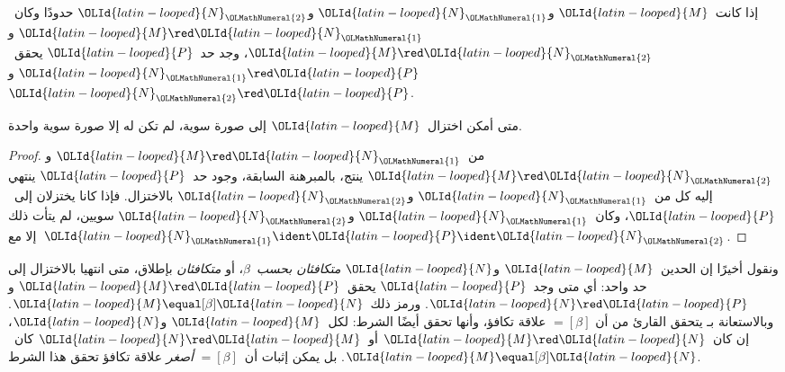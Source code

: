 \documentclass[../../../include/open-logic-section]{subfiles}
\begin{document}

\begin{thm}
إذا كانت~$\OLId{latin-looped}{M}$ و$\OLId{latin-looped}{N}_\OLMathNumeral{1}$ و$\OLId{latin-looped}{N}_\OLMathNumeral{2}$ حدودًا وكان~$\OLId{latin-looped}{M} \red \OLId{latin-looped}{N}_\OLMathNumeral{1}$ و$\OLId{latin-looped}{M} \red \OLId{latin-looped}{N}_\OLMathNumeral{2}$،
وجد حد~$\OLId{latin-looped}{P}$ يحقق~$\OLId{latin-looped}{N}_\OLMathNumeral{1} \red \OLId{latin-looped}{P}$ و$\OLId{latin-looped}{N}_\OLMathNumeral{2} \red \OLId{latin-looped}{P}$.
\end{thm}

\begin{cor}
متى أمكن اختزال~$\OLId{latin-looped}{M}$ إلى صورة سوية، لم تكن له إلا صورة سوية واحدة.
\end{cor}

\begin{proof}
من~$\OLId{latin-looped}{M} \red \OLId{latin-looped}{N}_\OLMathNumeral{1}$ و$\OLId{latin-looped}{M} \red \OLId{latin-looped}{N}_\OLMathNumeral{2}$ ينتج، بالمبرهنة السابقة،
وجود حد~$\OLId{latin-looped}{P}$ ينتهي إليه كل من~$\OLId{latin-looped}{N}_\OLMathNumeral{1}$ و$\OLId{latin-looped}{N}_\OLMathNumeral{2}$ بالاختزال.
فإذا كانا يختزلان إلى~$\OLId{latin-looped}{P}$، وكان~$\OLId{latin-looped}{N}_\OLMathNumeral{1}$ و$\OLId{latin-looped}{N}_\OLMathNumeral{2}$ سويين،
لم يتأت ذلك إلا مع~$\OLId{latin-looped}{N}_\OLMathNumeral{1} \ident \OLId{latin-looped}{P} \ident \OLId{latin-looped}{N}_\OLMathNumeral{2}$.
\end{proof}

ونقول أخيرًا إن الحدين~$\OLId{latin-looped}{M}$ و$\OLId{latin-looped}{N}$ \emph{متكافئان بحسب~$\beta$}،
أو \emph{متكافئان} بإطلاق، متى انتهيا بالاختزال إلى حد واحد:
أي متى وجد~$\OLId{latin-looped}{P}$ يحقق~$\OLId{latin-looped}{M} \red \OLId{latin-looped}{P}$ و$\OLId{latin-looped}{N} \red \OLId{latin-looped}{P}$.
ورمز ذلك~$\OLId{latin-looped}{M} \equal[\beta] \OLId{latin-looped}{N}$.
وبالاستعانة بـ يتحقق القارئ من أن
$\equal[\beta]$ علاقة تكافؤ، وأنها تحقق أيضًا الشرط:
لكل~$\OLId{latin-looped}{M}$ و$\OLId{latin-looped}{N}$، إن كان~$\OLId{latin-looped}{M} \red \OLId{latin-looped}{N}$ أو~$\OLId{latin-looped}{N} \red \OLId{latin-looped}{M}$
كان~$\OLId{latin-looped}{M} \equal[\beta] \OLId{latin-looped}{N}$.
بل يمكن إثبات أن~$\equal[\beta]$ \emph{أصغر} علاقة تكافؤ
تحقق هذا الشرط.
\end{document}
